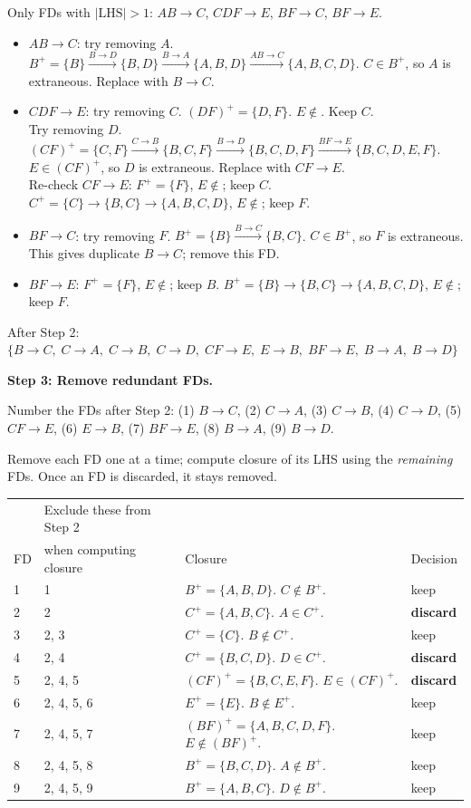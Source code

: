 \documentclass[11pt]{article}
\begin{document}
Only FDs with $|\text{LHS}| > 1$: $AB \to C$, $CDF \to E$,
$BF \to C$, $BF \to E$.
\begin{itemize}
\item $AB \to C$: try removing $A$.
  $B^+ = \{B\}
   \xrightarrow{B \to D} \{B,D\}
   \xrightarrow{B \to A} \{A,B,D\}
   \xrightarrow{AB \to C} \{A,B,C,D\}$.
  $C \in B^+$, so $A$ is extraneous. Replace with $B \to C$.
\item $CDF \to E$: try removing $C$.
  $(DF)^+ = \{D,F\}$. $E \notin$. Keep $C$.\\
  Try removing $D$.
  $(CF)^+ = \{C,F\}
   \xrightarrow{C \to B} \{B,C,F\}
   \xrightarrow{B \to D} \{B,C,D,F\}
   \xrightarrow{BF \to E} \{B,C,D,E,F\}$.
  $E \in (CF)^+$, so $D$ is extraneous. Replace with $CF \to E$.\\
  Re-check $CF \to E$: $F^+ = \{F\}$, $E \notin$; keep $C$.
  $C^+ = \{C\} \to \{B,C\} \to \{A,B,C,D\}$, $E \notin$; keep $F$.
\item $BF \to C$: try removing $F$.
  $B^+ = \{B\} \xrightarrow{B \to C} \{B,C\}$.
  $C \in B^+$, so $F$ is extraneous. This gives duplicate $B \to C$;
  remove this FD.
\item $BF \to E$: $F^+ = \{F\}$, $E \notin$; keep $B$.
  $B^+ = \{B\} \to \{B,C\} \to \{A,B,C,D\}$, $E \notin$; keep $F$.
\end{itemize}

After Step 2:
$\{B \to C,\; C \to A,\; C \to B,\; C \to D,\; CF \to E,\;
  E \to B,\; BF \to E,\; B \to A,\; B \to D\}$

\bigskip
\textbf{Step 3: Remove redundant FDs.}

Number the FDs after Step 2:
(1) $B \to C$,
(2) $C \to A$,
(3) $C \to B$,
(4) $C \to D$,
(5) $CF \to E$,
(6) $E \to B$,
(7) $BF \to E$,
(8) $B \to A$,
(9) $B \to D$.

Remove each FD one at a time; compute closure of its LHS using the
\emph{remaining} FDs. Once an FD is discarded, it stays removed.

\begin{tabular}{l|l|l|l}
   & Exclude these from Step 2 &             &          \\
FD & when computing closure     & Closure     & Decision \\
\hline
1 & 1 & $B^+ = \{A,B,D\}$. $C \notin B^+$. & keep \\
2 & 2 & $C^+ = \{A,B,C\}$. $A \in C^+$. & \textbf{discard} \\
3 & 2, 3 & $C^+ = \{C\}$. $B \notin C^+$. & keep \\
4 & 2, 4 & $C^+ = \{B,C,D\}$. $D \in C^+$. & \textbf{discard} \\
5 & 2, 4, 5 & $(CF)^+ = \{B,C,E,F\}$. $E \in (CF)^+$. & \textbf{discard} \\
6 & 2, 4, 5, 6 & $E^+ = \{E\}$. $B \notin E^+$. & keep \\
7 & 2, 4, 5, 7 & $(BF)^+ = \{A,B,C,D,F\}$. $E \notin (BF)^+$. & keep \\
8 & 2, 4, 5, 8 & $B^+ = \{B,C,D\}$. $A \notin B^+$. & keep \\
9 & 2, 4, 5, 9 & $B^+ = \{A,B,C\}$. $D \notin B^+$. & keep \\
\end{tabular}
\end{document}
